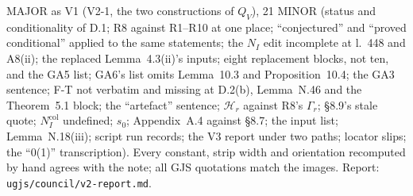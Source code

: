 MAJOR as V1 (V2-1, the two constructions of $Q_V$), 21 MINOR (status and conditionality of
D.1; R8 against R1--R10 at one place; ``conjectured'' and ``proved conditional'' applied to the
same statements; the $N_I$ edit incomplete at l.~448 and A8(ii); the replaced Lemma~4.3(ii)'s
inputs; eight replacement blocks, not ten, and the GA5 list; GA6's list omits Lemma~10.3 and
Proposition~10.4; the GA3 sentence; F-T not verbatim and missing at D.2(b), Lemma~N.46 and the
Theorem~5.1 block; the ``artefact'' sentence; $\mathcal H_r$ against R8's $\Gamma_r$; \S8.9's
stale quote; $N^{\mathrm{col}}_I$ undefined; $s_0$; Appendix~A.4 against \S8.7; the input list;
Lemma~N.18(iii); script run records; the V3 report under two paths; locator slips; the
``0(1)'' transcription). Every constant, strip width and orientation recomputed by hand
agrees with the note; all GJS quotations match the images. Report:
\texttt{ugjs/council/v2-report.md}.

